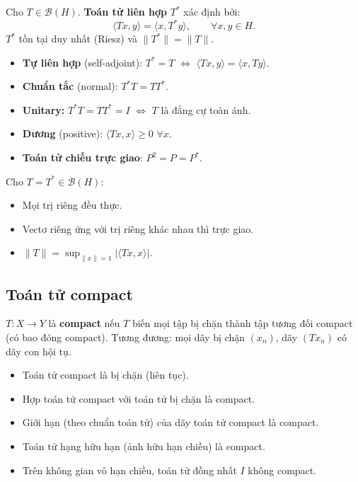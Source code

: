 \documentclass[12pt,a4paper]{article}
\begin{document}
\begin{dinhnghia}[title={Toán tử liên hợp}]
  Cho $T \in \mathcal{B}(H)$. \textbf{Toán tử liên hợp} $T^*$ xác định bởi:
  \[
    \langle Tx, y \rangle = \langle x, T^*y \rangle, \qquad \forall x, y \in H.
  \]
  $T^*$ tồn tại duy nhất (Riesz) và $\|T^*\| = \|T\|$.
\end{dinhnghia}

\begin{dinhnghia}[title={Phân loại toán tử}]
  \begin{itemize}
    \item \textbf{Tự liên hợp} (self-adjoint): $T^* = T$ $\Leftrightarrow$ $\langle Tx, y \rangle = \langle x, Ty \rangle$.
    \item \textbf{Chuẩn tắc} (normal): $T^*T = TT^*$.
    \item \textbf{Unitary:} $T^*T = TT^* = I$ $\Leftrightarrow$ $T$ là đẳng cự toàn ánh.
    \item \textbf{Dương} (positive): $\langle Tx, x \rangle \ge 0$ $\forall x$.
    \item \textbf{Toán tử chiếu trực giao}: $P^2 = P = P^*$.
  \end{itemize}
\end{dinhnghia}

\begin{tinhchat}[title={Toán tử tự liên hợp}]
  Cho $T = T^* \in \mathcal{B}(H)$:
  \begin{itemize}
    \item Mọi trị riêng đều thực.
    \item Vectơ riêng ứng với trị riêng khác nhau thì trực giao.
    \item $\|T\| = \sup_{\|x\|=1} |\langle Tx, x \rangle|$.
  \end{itemize}
\end{tinhchat}

\subsection{Toán tử compact}

\begin{dinhnghia}
  $T: X \to Y$ là \textbf{compact} nếu $T$ biến mọi tập bị chặn thành tập tương đối compact (có bao đóng compact). Tương đương: mọi dãy bị chặn $(x_n)$, dãy $(Tx_n)$ có dãy con hội tụ.
\end{dinhnghia}

\begin{tinhchat}
  \begin{itemize}
    \item Toán tử compact là bị chặn (liên tục).
    \item Hợp toán tử compact với toán tử bị chặn là compact.
    \item Giới hạn (theo chuẩn toán tử) của dãy toán tử compact là compact.
    \item Toán tử hạng hữu hạn (ảnh hữu hạn chiều) là compact.
    \item Trên không gian vô hạn chiều, toán tử đồng nhất $I$ không compact.
  \end{itemize}
\end{tinhchat}
\end{document}
